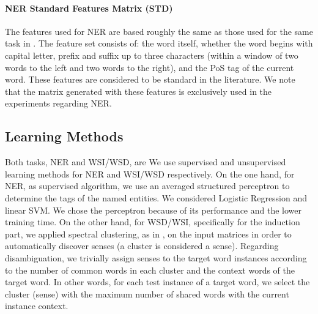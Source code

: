 \documentclass{llncs}
\begin{document}
\paragraph{NER Standard Features Matrix (STD)}

The features used for NER are based roughly the same as those used for the same task in \cite{Daume2006,Balasuriya2009}. The feature set consists of: the word itself, whether the word begins with capital letter, prefix and suffix up to three characters (within a window of two words to the left and two words to the right), and the PoS tag of the current word. These features are considered to be standard in the literature. We note that the matrix generated with these features is exclusively used in the experiments regarding NER.	

\subsection{Learning Methods}
Both tasks, NER and WSI/WSD, are
We use supervised and unsupervised learning methods for NER and WSI/WSD respectively. On the one hand, for NER, as supervised algorithm, we use an averaged structured perceptron \cite{Collins2002,Daume2006} to determine the tags of the named entities. We considered Logistic Regression and linear SVM. We chose the perceptron because of its performance and the lower training time.
\textsl{}
On the other hand, for WSD/WSI, specifically for the induction part, we applied spectral clustering, as in  \cite{GoyalH14}, on the input matrices in order to automatically discover senses (a cluster is considered a sense). Regarding disambiguation, we trivially assign senses to the target word instances according to the number of common words in each cluster and the context words of the target word. In other words, for each test instance of a target word, we select the cluster (sense) with the maximum number of shared words with the current instance context.


\end{document}
